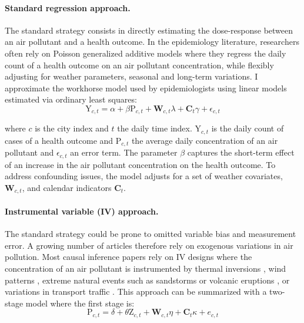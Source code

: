 \documentclass[12pt]{article}
\begin{document}
        \begin{sloppypar}
        \paragraph{Standard regression approach.} The standard strategy consists in directly estimating the dose-response between an air pollutant and a health outcome. In the epidemiology literature, researchers often rely on Poisson generalized additive models where they regress the daily count of a health outcome on an air pollutant concentration, while flexibly adjusting for weather parameters, seasonal and long-term variations. I approximate the workhorse model used by epidemiologists using linear models estimated via ordinary least squares:
        ~
        \begin{equation}
            \text{Y}_{c,t} = \alpha + \beta\text{P}_{c,t} + \textbf{W}_{c,t}\lambda + \textbf{C}_{t}\gamma + \epsilon_{c,t}
        \end{equation}
        \end{sloppypar}
        
        \noindent where $c$ is the city index and $t$ the daily time index. $\text{Y}_{c,t}$ is the daily count of cases of a health outcome and $\text{P}_{c,t}$ the average daily concentration of an air pollutant and $\epsilon_{c,t}$ an error term. The parameter $\beta$ captures the short-term effect of an increase in the air pollutant concentration on the health outcome. To address confounding issues, the model adjusts for a set of weather covariates,  $\textbf{W}_{c,t}$, and calendar indicators $\textbf{C}_{t}$. 
        
        \begin{sloppypar}
        \paragraph{Instrumental variable (IV) approach.} The standard strategy could be prone to omitted variable bias and measurement error. A growing number of articles therefore rely on exogenous variations in air pollution. Most causal inference papers rely on IV designs where the concentration of an air pollutant is instrumented by thermal inversions \citep{arceo_does_2016}, wind patterns \citep{schwartz_national_2018, deryugina_mortality_2019}, extreme natural events such as sandstorms or volcanic eruptions \citep{ebenstein_particulate_2015, halliday_vog_2019}, or variations in transport traffic \citep{moretti_pollution_2011, knittel_caution_2016, schlenker_airports_2016}. This approach can be summarized with a two-stage model where the first stage is: 
        ~
        \begin{equation}
        \text{P}_{c,t} = \delta + \theta\text{Z}_{c,t} + \textbf{W}_{c,t}\eta + \textbf{C}_{t}\kappa + e_{c,t}
        \end{equation}
        \end{sloppypar}
        
\end{document}

